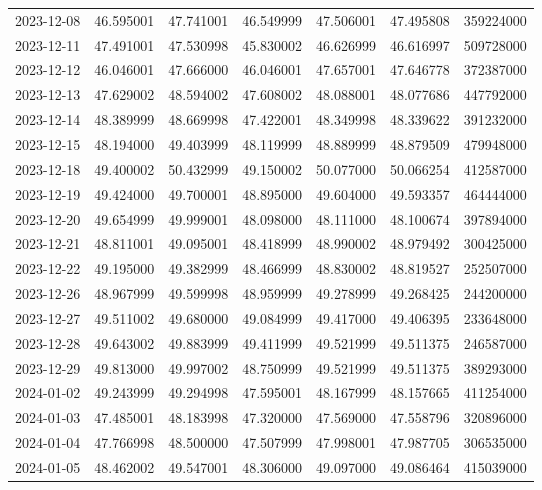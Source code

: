 \begin{tabular}{lrrrrrr}
2023-12-08 &   46.595001 &   47.741001 &   46.549999 &   47.506001 &   47.495808 &   359224000 \\
2023-12-11 &   47.491001 &   47.530998 &   45.830002 &   46.626999 &   46.616997 &   509728000 \\
2023-12-12 &   46.046001 &   47.666000 &   46.046001 &   47.657001 &   47.646778 &   372387000 \\
2023-12-13 &   47.629002 &   48.594002 &   47.608002 &   48.088001 &   48.077686 &   447792000 \\
2023-12-14 &   48.389999 &   48.669998 &   47.422001 &   48.349998 &   48.339622 &   391232000 \\
2023-12-15 &   48.194000 &   49.403999 &   48.119999 &   48.889999 &   48.879509 &   479948000 \\
2023-12-18 &   49.400002 &   50.432999 &   49.150002 &   50.077000 &   50.066254 &   412587000 \\
2023-12-19 &   49.424000 &   49.700001 &   48.895000 &   49.604000 &   49.593357 &   464444000 \\
2023-12-20 &   49.654999 &   49.999001 &   48.098000 &   48.111000 &   48.100674 &   397894000 \\
2023-12-21 &   48.811001 &   49.095001 &   48.418999 &   48.990002 &   48.979492 &   300425000 \\
2023-12-22 &   49.195000 &   49.382999 &   48.466999 &   48.830002 &   48.819527 &   252507000 \\
2023-12-26 &   48.967999 &   49.599998 &   48.959999 &   49.278999 &   49.268425 &   244200000 \\
2023-12-27 &   49.511002 &   49.680000 &   49.084999 &   49.417000 &   49.406395 &   233648000 \\
2023-12-28 &   49.643002 &   49.883999 &   49.411999 &   49.521999 &   49.511375 &   246587000 \\
2023-12-29 &   49.813000 &   49.997002 &   48.750999 &   49.521999 &   49.511375 &   389293000 \\
2024-01-02 &   49.243999 &   49.294998 &   47.595001 &   48.167999 &   48.157665 &   411254000 \\
2024-01-03 &   47.485001 &   48.183998 &   47.320000 &   47.569000 &   47.558796 &   320896000 \\
2024-01-04 &   47.766998 &   48.500000 &   47.507999 &   47.998001 &   47.987705 &   306535000 \\
2024-01-05 &   48.462002 &   49.547001 &   48.306000 &   49.097000 &   49.086464 &   415039000 \\

\end{tabular}
